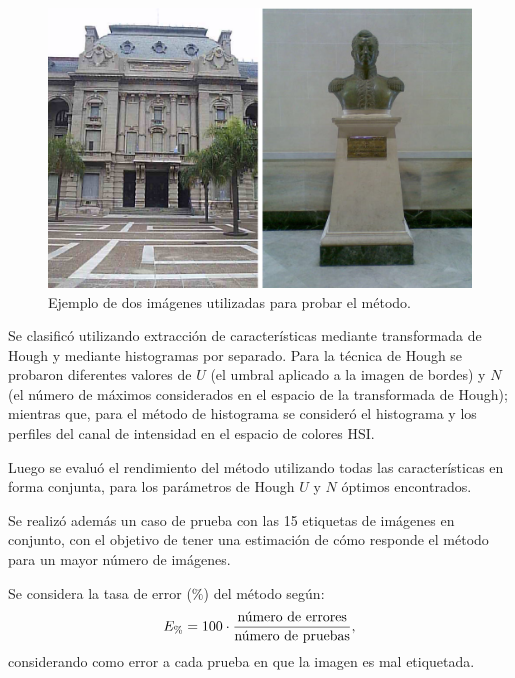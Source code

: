 \documentclass[conference,a4paper,10pt,oneside,final]{tfmpd}
\begin{document}
\begin{figure}
\begin{center}
\includegraphics[scale=0.25]{../diagramas/dibujo}
\end{center}
\caption{Ejemplo de dos imágenes utilizadas para probar el método.}
\label{imagenes}
\end{figure}

Se clasificó utilizando extracción de características mediante
transformada de Hough y mediante histogramas por separado.
Para la técnica de Hough se probaron diferentes valores de $U$ (el umbral
aplicado a la imagen de bordes) y $N$ (el número de máximos considerados
en el espacio de la transformada de Hough); mientras que,
para el método de histograma se consideró el histograma y los perfiles
del canal de intensidad en el espacio de colores HSI.

Luego se evaluó el rendimiento del método utilizando todas las características
en forma conjunta, para los parámetros de Hough $U$ y $N$ óptimos encontrados.

Se realizó además un {caso de prueba} con las 15 etiquetas de
imágenes en conjunto, con el objetivo de tener una estimación de cómo responde
el método para un mayor número de imágenes.

Se considera la tasa de error ($\%$) del método según:
\begin{equation}
E_\%=100\cdot\frac{\textrm{número de errores}}{\textrm{número de pruebas}},
\end{equation}
considerando como error a cada prueba en que la imagen es mal etiquetada.
\end{document}
